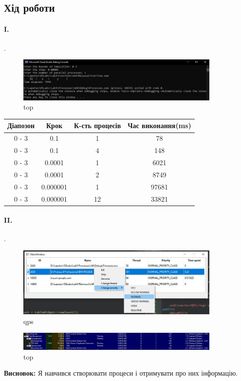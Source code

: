 \documentclass[12pt]{extarticle}
\begin{document}
\subsection*{Хід роботи}


\paragraph{I.}.
\begin{figure}[H]
    \centering
    \includegraphics[width=0.90\textwidth]{func.jpg}
    \caption{top}
\end{figure}

\begin{center}
    \begin{tabular}{| c | c | c | c |}
        \hline
        Діапозон &Крок& К-сть процесів & Час виконання(ms)\\
        \hline
        0 - 3 &  0.1  & 1 & 78 \\
        0 - 3 &  0.1  & 4 & 148 \\
        \hline
        0 - 3 &  0.0001  & 1 & 6021 \\
        0 - 3 &  0.0001  & 2 & 8749 \\
        \hline
        0 - 3 &  0.000001  & 1 & 97681 \\
        0 - 3 &  0.000001  & 12 & 33821 \\
        \hline
   
    \end{tabular}

\end{center}
\paragraph{II.}.

\begin{figure}[H]
    \centering
    \includegraphics[width=0.90\textwidth]{ui.jpg}
    \caption{qps}
\end{figure}
\begin{figure}[H]
    \centering
    \includegraphics[width=0.90\textwidth]{exp.jpg}
    \caption{top}
\end{figure}
\textbf{Висновок:}
Я навчився створювати процеси і отримувати про них інформацію.
 
\end{document}
